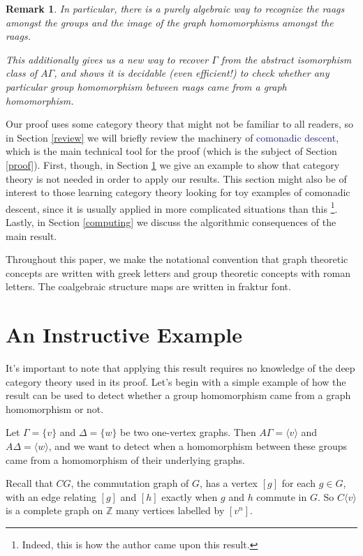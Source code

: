 \documentclass[12pt]{article}
\newtheorem*{rmk}{Remark}
\theoremstyle{definition}
\theoremstyle{theorem}
\newcommand*{\important}[1]{\textcolor{MidnightBlue}{#1}}
\begin{document}
  \begin{rmk}
    In particular, there is a purely algebraic way to recognize the 
    raags amongst the groups and the image of the graph homomorphisms 
    amongst the raags.

    This additionally gives us a new way to recover $\Gamma$ from the 
    abstract isomorphism class of $A \Gamma$, and shows it is 
    decidable (even efficient!) to check whether any particular
    group homomorphism between raags came from a graph homomorphism.
  \end{rmk}

  Our proof uses some category theory that might not be familiar to all
  readers, so in Section \ref{review} we will briefly review the machinery 
  of \important{comonadic descent}, which is the main technical tool for 
  the proof (which is the subject of Section \ref{proof}). 
  First, though, in Section \ref{eg} we give an example to show that 
  category theory is not needed in order to apply our results.
  This section might also be of interest to 
  those learning category theory looking for toy examples of comonadic descent, 
  since it is usually applied in more complicated situations than this%
  \footnote{Indeed, this is how the author came upon this result.}. 
  Lastly, in Section \ref{computing} we discuss the algorithmic consequences 
  of the main result.

  Throughout this paper, we make the notational convention that graph theoretic 
  concepts are written with greek letters and group theoretic concepts with 
  roman letters. The coalgebraic structure maps are written in fraktur font.

\section{An Instructive Example}
\label{eg}

It's important to note that applying this result requires no knowledge of 
the deep category theory used in its proof. Let's begin with a simple example
of how the result can be used to detect whether a group 
homomorphism came from a graph homomorphism or not.

Let $\Gamma = \{ v \}$ and $\Delta = \{ w \}$ be two one-vertex graphs.
Then $A \Gamma = \langle v \rangle$ and $A \Delta = \langle w \rangle$,
and we want to detect when a homomorphism between these groups came from a
homomorphism of their underlying graphs.

Recall that $CG$, the commutation graph of $G$, has a vertex $[g]$ for 
each $g \in G$, with an edge relating $[g]$ and $[h]$ exactly when 
$g$ and $h$ commute in $G$. So $C \langle v \rangle$ is a complete 
graph on $\mathbb{Z}$ many vertices labelled by $[v^n]$.
\end{document}
